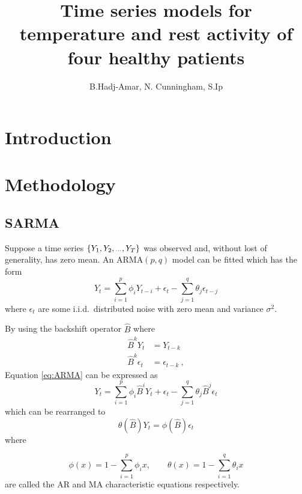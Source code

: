 \documentclass[]{article}
\title{\textbf{Time series models for temperature and rest activity of four healthy patients}}
\author{B.Hadj-Amar, N. Cunningham, S.Ip}
\newcommand{\dotdotdot}{\vphantom{.}_{\cdots}}
\newcommand{\backshift}{\widehat{B}}
\begin{document}
\maketitle

\begin{abstract}

\end{abstract}

\section{Introduction}

\section{Methodology}

\subsection{SARMA}
Suppose a time series $\{Y_1,Y_2,\dotdotdot,Y_T\}$ was observed and, without lost of generality, has zero mean. An ARMA$(p,q)$ model can be fitted which has the form
\begin{equation}
Y_t = \sum_{i=1}^{p} \phi_i Y_{t-i} + \epsilon_t - \sum_{j=1}^{q} \theta_{j} \epsilon_{t-j}
\label{eq:ARMA}
\end{equation}
where $\epsilon_t$ are some i.i.d.~distributed noise with zero mean and variance $\sigma^2$.

By using the backshift operator $\backshift$ where
\begin{align*}
\backshift^k Y_t &= Y_{t-k} \\
\backshift^k \epsilon_t &= \epsilon_{t-k} \ ,
\end{align*}
Equation \eqref{eq:ARMA} can be expressed as
\begin{equation*}
Y_t = \sum_{i=1}^{p} \phi_i \backshift^i Y_{t} + \epsilon_t - \sum_{j=1}^{q} \theta_{j} \backshift^j \epsilon_{t}
\end{equation*}
which can be rearranged to
\begin{equation*}
\theta\left(\backshift\right)Y_t=\phi\left(\backshift\right)\epsilon_t
\end{equation*}
where


\begin{equation*}
\phi(x)=1-\sum_{i=1}^{p} \phi_i x, \qquad \theta(x)=1-\sum_{i=1}^{q} \theta_i x
\end{equation*}
are called the AR and MA characteristic equations respectively.
\vspace{0.1cm}
\end{document}
